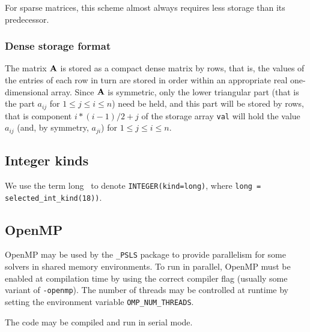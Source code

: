 \documentclass{galahad}
\newcommand{\packagename}{PSLS}
\newcommand{\fullpackagename}{\libraryname\_\-\packagename}
\begin{document}
For sparse matrices, this scheme almost always requires less storage than
its predecessor.

\subsubsection{Dense storage format}\label{dense}
The matrix ${\mathbf{A}}$ is stored as a compact
dense matrix by rows, that is, the values of the entries of each row in turn are
stored in order within an appropriate real one-dimensional array.
Since ${\mathbf{A}}$ is symmetric, only the lower triangular part (that is the part
$a_{ij}$ for $1 \leq j \leq i \leq n$) need be held, and this part will be
stored by rows, that is component
$i \ast (i-1)/2 + j$ of the storage array {\tt val}
will hold the value $a_{ij}$ (and, by symmetry, $a_{ji}$)
for $1 \leq j \leq i \leq n$.



\subsection{Integer kinds}\label{Integer kinds}
We use the term
long \integer\ to denote {\tt INTEGER\-(kind=long)}, where
{\tt long = selected\_int\_kind(18))}.



\subsection{OpenMP}
OpenMP may be used by the {\tt \fullpackagename} package to provide
parallelism for some solvers in shared memory environments.
To run in parallel, OpenMP
must be enabled at compilation time by using the correct compiler flag
(usually some variant of {\tt -openmp}).
The number of threads may be controlled at runtime
by setting the environment variable {\tt OMP\_NUM\_THREADS}.

\noindent
The code may be compiled and run in serial mode.
\end{document}
